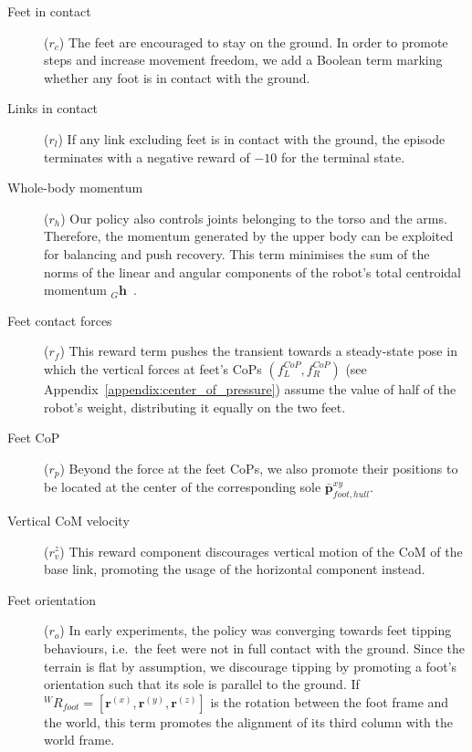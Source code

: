 \begin{description}

\item[Feet in contact]\!($r_c$)\;
%
The feet are encouraged to stay on the ground.
In order to promote steps and increase movement freedom, we add a Boolean term marking whether any foot is in contact with the ground.

\item[Links in contact]\!($r_l$)\;
%
If any link excluding feet is in contact with the ground, the episode terminates with a negative reward of $-10$ for the terminal state.

\item[Whole-body momentum]\!($r_h$)\;
%
Our policy also controls joints belonging to the torso and the arms.
Therefore, the momentum generated by the upper body can be exploited for balancing and push recovery.
This term minimises the sum of the norms of the linear and angular components of the robot's total centroidal momentum ${}_G \mathbf{h}$~\parencite{traversaro_unied_2017}.

\item[Feet contact forces]\!($r_f$)\;
%
This reward term pushes the transient towards a steady-state pose in which the vertical forces at feet's \acp{CoP} $(f^{CoP}_L, f^{CoP}_R)$ (see Appendix~\ref{appendix:center_of_pressure}) assume the value of half of the robot's weight, distributing it equally on the two feet.

\item[Feet CoP]\!($r_p$)\;
%
Beyond the force at the feet \acp{CoP}, we also promote their positions to be located at the center of the corresponding sole $\bar{\boldsymbol{p}}^{xy}_{foot, hull}$.

\item[Vertical CoM velocity]\!($r_{v}^z$)\;
%
This reward component discourages vertical motion of the \ac{CoM} of the base link, promoting the usage of the horizontal component instead.

\item[Feet orientation]\!($r_o$)\;
%
In early experiments, the policy was converging towards feet tipping behaviours, i.e.\ the feet were not in full contact with the ground.
Since the terrain is flat by assumption, we discourage tipping by promoting a foot's orientation such that its sole is parallel to the ground.
If ${}^W R_{foot} = [\mathbf{r}^{(x)}, \mathbf{r}^{(y)}, \mathbf{r}^{(z)}]$ is the rotation between the foot frame and the world, this term promotes the alignment of its third column with the world frame.

\end{description}


